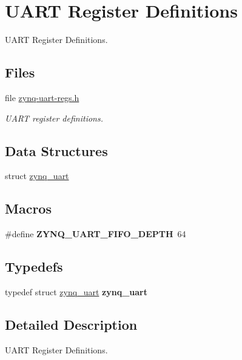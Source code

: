 \hypertarget{group__zynq__uart__regs}{}\section{U\+A\+RT Register Definitions}
\label{group__zynq__uart__regs}


U\+A\+RT Register Definitions.  


\subsection*{Files}
\begin{DoxyCompactItemize}
\item 
file \mbox{\hyperlink{zynq-uart-regs_8h}{zynq-\/uart-\/regs.\+h}}
\begin{DoxyCompactList}\small\item\em U\+A\+RT register definitions. \end{DoxyCompactList}\end{DoxyCompactItemize}
\subsection*{Data Structures}
\begin{DoxyCompactItemize}
\item 
struct \mbox{\hyperlink{structzynq__uart}{zynq\+\_\+uart}}
\end{DoxyCompactItemize}
\subsection*{Macros}
\begin{DoxyCompactItemize}
\item 
\mbox{\label{group__zynq__uart__regs_ga2de9657eeee25f7a468b353320a19a35}} 
\#define {\bfseries Z\+Y\+N\+Q\+\_\+\+U\+A\+R\+T\+\_\+\+F\+I\+F\+O\+\_\+\+D\+E\+P\+TH}~64
\end{DoxyCompactItemize}
\subsection*{Typedefs}
\begin{DoxyCompactItemize}
\item 
\mbox{\label{group__zynq__uart__regs_ga3d7815c4efe3888ba3070ca28733adad}} 
typedef struct \mbox{\hyperlink{structzynq__uart}{zynq\+\_\+uart}} {\bfseries zynq\+\_\+uart}
\end{DoxyCompactItemize}


\subsection{Detailed Description}
U\+A\+RT Register Definitions. 

